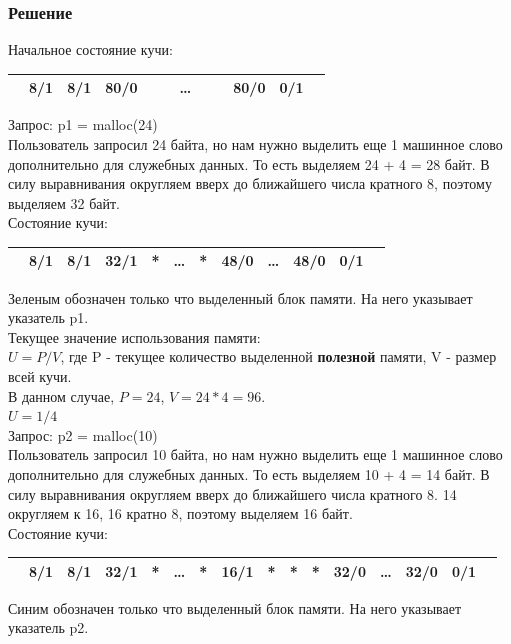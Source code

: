 \documentclass[12pt, letterpaper]{article}
\begin{document}
\subsubsection{Решение}
Начальное состояние кучи:
\begin{center}
    \begin{tabular}{c*{11}{|c}}
        \hline
          &  8/1 &  8/1 & 80/0 & & & \dots & & & 80/0 & 0/1 \\
        \hline
    \end{tabular}
\end{center}
Запрос: p1 = malloc(24)\\
Пользователь запросил 24 байта, но нам нужно выделить еще 1 машинное слово дополнительно для служебных данных. То есть выделяем 24 + 4 = 28 байт. В силу выравнивания округляем вверх до ближайшего числа кратного 8, поэтому выделяем 32 байт.\\
Состояние кучи:
\begin{center}
    \begin{tabular}{c*{11}{|c}}
        \hline
          &  8/1 &  8/1 & 32/1 &*& \dots & * & 48/0 & \dots & 48/0 & 0/1 \\
        \hline
    \end{tabular}
\end{center}
Зеленым обозначен только что выделенный блок памяти. На него указывает указатель p1.\\
Текущее значение использования памяти:\\
$U=P/V$, где P - текущее количество выделенной \textbf{полезной} памяти, V - размер всей кучи.\\
В данном случае, $P=24$, $V=24 * 4 = 96$.\\ 
$U=1/4$\\

Запрос: p2 = malloc(10)\\
Пользователь запросил 10 байта, но нам нужно выделить еще 1 машинное слово дополнительно для служебных данных. То есть выделяем 10 + 4 = 14 байт. В силу выравнивания округляем вверх до ближайшего числа кратного 8. 14 округляем к 16, 16 кратно 8, поэтому выделяем 16 байт.\\
Состояние кучи:
\begin{center}
    \begin{tabular}{c*{15}{|c}}
        \hline
          &  8/1 &  8/1 & 32/1 &*& \dots & * & 16/1 & *& *& *&32/0& \dots & 32/0 & 0/1 \\
        \hline
    \end{tabular}
\end{center}
Синим обозначен только что выделенный блок памяти. На него указывает указатель p2.\\
\end{document}
